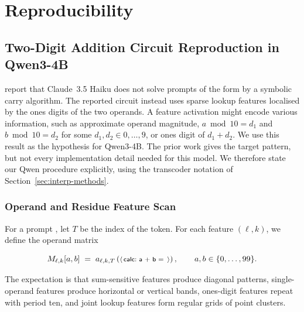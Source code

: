 \chapter{Reproducibility}
\label{sec:repro}

\makeatletter
{}
\makeatother

\section{Two-Digit Addition Circuit Reproduction in Qwen3-4B}

\citet{lindsey2025biology} report that Claude~3.5 Haiku does not solve
prompts of the form  by a symbolic carry
algorithm.  The reported circuit instead uses sparse lookup features localised
by the ones digits of the two operands.  A feature activation might
encode various information, such as approximate operand magnitude,
$a \bmod 10 = d_1$ and $b \bmod 10 = d_2$ for some $d_1, d_2 \in {0, \ldots, 9}$, 
or ones digit of
$d_1+d_2$.  We use this result as the hypothesis for Qwen3-4B.  The
prior work gives the target pattern, but not every implementation detail needed
for this model.  We therefore state our Qwen procedure explicitly, using the
transcoder notation of Section~\ref{sec:interp-methods}.

\subsection{Operand and Residue Feature Scan}
\label{subsec:operand-plots}

For a prompt , let $T$ be the index of the
\promptinline{=} token.  For each feature $(\ell,k)$, we define the operand
matrix

\begin{equation}
  M_{\ell,k}[a,b]
    \;=\; a_{\ell,k,T}
          \left( \text{\mbox{\normalfont\footnotesize\sffamily\(\langle\)\,calc:~a + b =~\,\(\rangle\)}}\right),
    \qquad a,b \in \{0,\ldots,99\}.
  \label{eq:operand-matrix}
\end{equation}

The expectation is that sum-sensitive features produce diagonal patterns, 
single-operand features produce horizontal or vertical
bands, ones-digit features repeat with period ten, and joint lookup features form regular
grids of point clusters.

